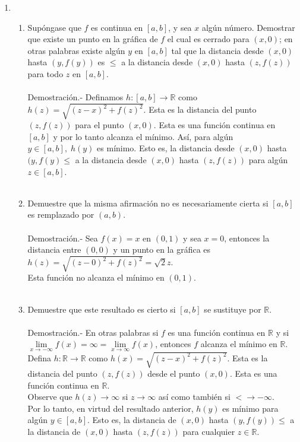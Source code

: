 \begin{enumerate}
\item 
    \begin{enumerate}[\bfseries (a)]

	\item Supóngase que $f$ es continua en $[a,b]$, y sea $x$ algún número. Demostrar que existe un punto en la gráfica de $f$ el cual es cerrado para $(x,0)$; en otras palabras existe algún $y$ en $[a,b]$ tal que la distancia desde $(x,0)$ hasta $(y,f(y))$ es $\leq$ a la distancia desde $(x,0)$ hasta $(z,f(z))$ para todo $z$ en $[a,b]$.\\\\
	    Demostración.-\; Definamos $h :  {[a,b]\to \mathbb{R}}$ como $h(z)=\sqrt{(z-x)^2+f(z)^2}$. Esta es la distancia del punto $(z,f(z))$ para el punto $(x,0)$. Esta es una función continua en $[a,b]$ y por lo tanto alcanza el mínimo. Así, para algún $y \in [a,b],\; h(y)$ es mínimo. Esto es, la distancia desde $(x,0)$ hasta $(y,f(y)\leq$ a la distancia desde $(x,0)$ hasta $(z,f(z))$ para algún $z\in [a,b]$.\\\\

	\item Demuestre que la misma afirmación no es necesariamente cierta si $[a,b]$ es remplazado por $(a,b)$.\\\\
	    Demostración.-\; Sea $f(x)=x$ en $(0,1)$ y sea $x=0$, entonces la distancia entre $(0,0)$ y un punto en la gráfica es $h(z)=\sqrt{(z-0)^2+f(z)^2}=\sqrt{2}z$.\\
	    Esta función no alcanza el mínimo en $(0,1).$\\\\

	\item Demuestre que este resultado es cierto si $[a,b]$ se sustituye por $\mathbb{R}$.\\\\
	    Demostración.-\; En otras palabras si $f$ es una función continua en $\mathbb{R}$ y si $\lim\limits_{x\to -\infty} f(x)=\infty = \lim\limits_{x\to \infty} f(x)$, entonces $f$ alcanza el mínimo en $\mathbb{R}$.\\
	    Defina $h: {\mathbb{R} \to \mathbb{R}}$ como $h(x)=\sqrt{(z-x)^2+f(z)^2}$. Esta es la distancia del punto $(z,f(z))$ desde el punto $(x,0)$. Esta es una función continua en $\mathbb{R}.$\\
	    Observe que ${h(z)\to \infty}$ si ${z\to \infty}$ así como también si ${<\to -\infty}$.\\
	    Por lo tanto, en virtud del resultado anterior, $h(y)$ es mínimo para algún $y\in [a,b]$. Esto es, la distancia de $(x,0)$ hasta $(y,f(y)) \leq$ a la distancia de $(x,0)$ hasta $(z,f(z))$ para cualquier $z\in \mathbb{R}$.\\\\


\end{enumerate}
\end{enumerate}
